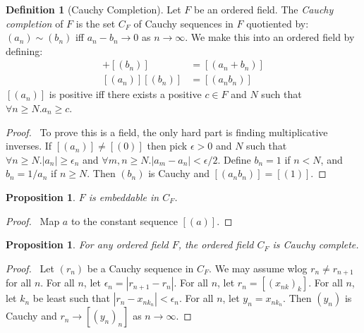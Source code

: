 \documentclass{article}
\let\qed\relax
\newtheorem{proposition}[axiom]{Proposition}
\theoremstyle{definition}
\newtheorem{definition}[axiom]{Definition}
\begin{document}
    \begin{definition}[Cauchy Completion]
        Let $F$ be an ordered field. The \emph{Cauchy completion} of $F$ is the set $C_F$ of Cauchy sequences in $F$ quotiented by:
        $(a_n) \sim (b_n)$ iff $a_n - b_n \rightarrow 0$ as $n \rightarrow \infty$. We make this into an ordered field by defining:
        \begin{align*}
            [(a_n)] + [(b_n)] & = [(a_n + b_n)] \\
            [(a_n)] [(b_n)] & = [(a_n b_n)]
        \end{align*}
        $[(a_n)]$ is positive iff there exists a positive $c \in F$ and $N$ such that $\forall n \geq N. a_n \geq c$.
    \end{definition}

    \begin{proof}
        \pf\ To prove this is a field, the only hard part is finding multiplicative inverses. If $[(a_n)] \neq [(0)]$ then pick $\epsilon > 0$ and $N$
        such that $\forall n \geq N. |a_n| \geq \epsilon_n$ and $\forall m,n \geq N. |a_m - a_n| < \epsilon / 2$. Define $b_n = 1$ if $n < N$,
        and $b_n = 1/a_n$ if $n \geq N$. Then $(b_n)$ is Cauchy and $[(a_n b_n)] = [(1)]$. \qed
    \end{proof}

    \begin{proposition}
        $F$ is embeddable in $C_F$.
    \end{proposition}

    \begin{proof}
        \pf\ Map $a$ to the constant sequence $[(a)]$. \qed
    \end{proof}

    \begin{proposition}
        For any ordered field $F$, the ordered field $C_F$ is Cauchy complete.
    \end{proposition}

    \begin{proof}
        \pf\ Let $(r_n)$ be a Cauchy sequence in $C_F$. We may assume wlog $r_n \neq r_{n+1}$ for all $n$. For all $n$, let
        $\epsilon_n = |r_{n+1} - r_n|$. For all $n$, let $r_n = [(x_{nk})_k]$. For all $n$, let $k_n$ be least such that
        $|r_n - x_{nk_n}| < \epsilon_n$. For all $n$, let $y_n = x_{nk_n}$. Then $(y_n)$ is Cauchy and $r_n \rightarrow [(y_n)_n]$
        as $n \rightarrow \infty$. \qed
    \end{proof}
\end{document}
